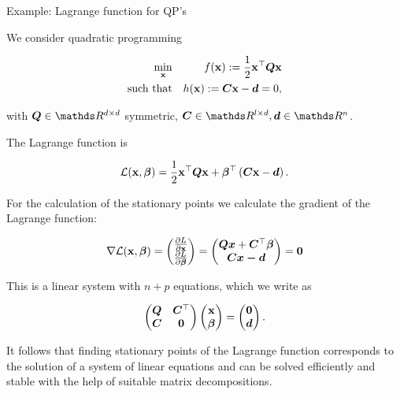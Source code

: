 \documentclass[11pt,compress,t,notes=noshow, xcolor=table]{beamer}
\begin{document}
\begin{vbframe}{Example: Lagrange function for QP's}


We consider quadratic programming

\begin{eqnarray*}
\min_{\mathbf{x}} && f(\mathbf{x}) := \frac{1}{2} \mathbf{x}^\top \bm{Q} \mathbf{x} \\
\text{such that} && h(\mathbf{x}) := \bm{C} \mathbf{x} - \bm{d} = 0,
\end{eqnarray*}

with $\bm{Q} \in \R^{d\times d}$ symmetric, $\bm{C} \in \R^{l \times d}, \bm{d} \in \R^n$.

\lz

The Lagrange function is

$$
\mathcal{L}(\mathbf{x}, \bm{\beta}) = \frac{1}{2} \mathbf{x}^\top \bm{Q} \mathbf{x} + \bm{\beta}^\top \left(\bm{C} \mathbf{x} - \bm{d}\right).
$$

\framebreak

For the calculation of the stationary points we calculate the gradient of the Lagrange function:

$$
\nabla \mathcal{L}(\mathbf{x}, \bm{\beta}) = \begin{pmatrix} \frac{\partial{L}}{\partial{\mathbf{x}}}  \\ \frac{\partial{L}}{\partial{\bm{\beta}}} \end{pmatrix} = \begin{pmatrix} \bm{Qx} + \bm{C}^\top\bm{\beta} \\ \bm{Cx - \bm{d}} \end{pmatrix} = \bm{0}
$$

This is a linear system with $n + p$ equations, which we write as

$$
\begin{pmatrix} \bm{Q} & \bm{C}^\top \\ \bm{C} & \bm{0} \end{pmatrix} \begin{pmatrix} \mathbf{x} \\ \bm{\beta} \end{pmatrix} = \begin{pmatrix} \bm{0} \\ \bm{d}  \end{pmatrix}.
$$

It follows that finding stationary points of the Lagrange function corresponds to the solution of a system of linear equations and can be solved efficiently and stable with the help of suitable matrix decompositions.
\end{vbframe}
\end{document}
